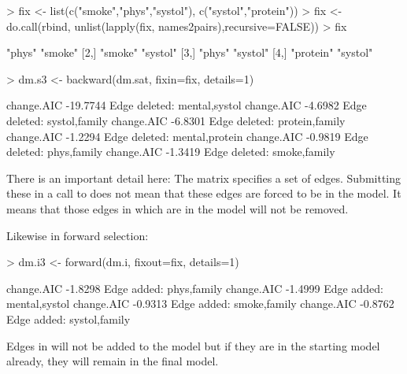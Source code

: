 \documentclass[12pt]{article}
\begin{document}
\begin{Schunk}
\begin{Sinput}
> fix <- list(c("smoke","phys","systol"), c("systol","protein"))
> fix <- do.call(rbind, unlist(lapply(fix, names2pairs),recursive=FALSE))
> fix
\end{Sinput}
\begin{Soutput}
     [,1]      [,2]    
[1,] "phys"    "smoke" 
[2,] "smoke"   "systol"
[3,] "phys"    "systol"
[4,] "protein" "systol"
\end{Soutput}
\begin{Sinput}
> dm.s3 <- backward(dm.sat, fixin=fix, details=1)
\end{Sinput}
\begin{Soutput}
  change.AIC  -19.7744 Edge deleted: mental,systol
  change.AIC   -4.6982 Edge deleted: systol,family
  change.AIC   -6.8301 Edge deleted: protein,family
  change.AIC   -1.2294 Edge deleted: mental,protein
  change.AIC   -0.9819 Edge deleted: phys,family
  change.AIC   -1.3419 Edge deleted: smoke,family
\end{Soutput}
\end{Schunk}

There is an important detail here: The matrix  specifies a
set of edges. Submitting these in a call to  does
not mean that these edges are forced to be in the model. It means that
those edges in  which are in the model will not be removed.

Likewise in forward selection:

\begin{Schunk}
\begin{Sinput}
> dm.i3 <- forward(dm.i, fixout=fix, details=1)
\end{Sinput}
\begin{Soutput}
  change.AIC   -1.8298 Edge added: phys,family
  change.AIC   -1.4999 Edge added: mental,systol
  change.AIC   -0.9313 Edge added: smoke,family
  change.AIC   -0.8762 Edge added: systol,family
\end{Soutput}
\end{Schunk}

Edges in  will not be added to the model but if they are in
the starting model already, they will remain in the final model.



\end{document}
